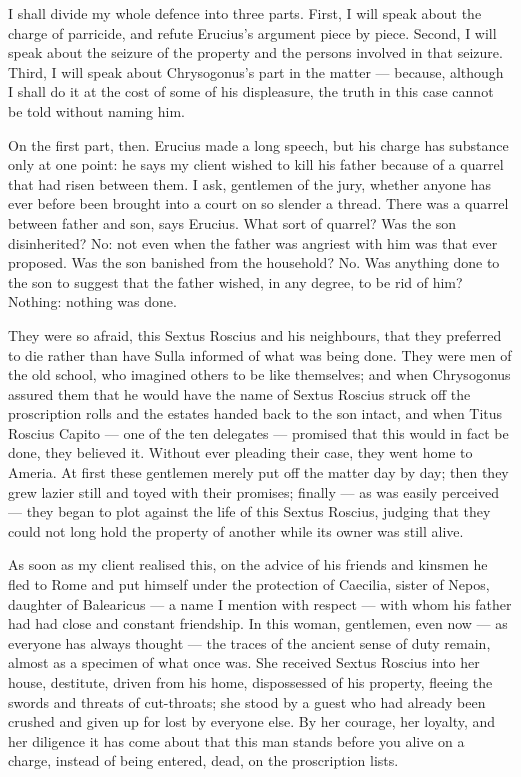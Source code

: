  I shall divide my whole defence into three parts. First, I will speak about the charge of parricide, and refute Erucius's argument piece by piece. Second, I will speak about the seizure of the property and the persons involved in that seizure. Third, I will speak about Chrysogonus's part in the matter --- because, although I shall do it at the cost of some of his displeasure, the truth in this case cannot be told without naming him.

 On the first part, then. Erucius made a long speech, but his charge has substance only at one point: he says my client wished to kill his father because of a quarrel that had risen between them. I ask, gentlemen of the jury, whether anyone has ever before been brought into a court on so slender a thread. There was a quarrel between father and son, says Erucius. What sort of quarrel? Was the son disinherited? No: not even when the father was angriest with him was that ever proposed. Was the son banished from the household? No. Was anything done to the son to suggest that the father wished, in any degree, to be rid of him? Nothing: nothing was done.

 They were so afraid, this Sextus Roscius and his neighbours, that they preferred to die rather than have Sulla informed of what was being done. They were men of the old school, who imagined others to be like themselves; and when Chrysogonus assured them that he would have the name of Sextus Roscius struck off the proscription rolls and the estates handed back to the son intact, and when Titus Roscius Capito --- one of the ten delegates --- promised that this would in fact be done, they believed it. Without ever pleading their case, they went home to Ameria. At first these gentlemen merely put off the matter day by day; then they grew lazier still and toyed with their promises; finally --- as was easily perceived --- they began to plot against the life of this Sextus Roscius, judging that they could not long hold the property of another while its owner was still alive.

 As soon as my client realised this, on the advice of his friends and kinsmen he fled to Rome and put himself under the protection of Caecilia, sister of Nepos, daughter of Balearicus --- a name I mention with respect --- with whom his father had had close and constant friendship. In this woman, gentlemen, even now --- as everyone has always thought --- the traces of the ancient sense of duty remain, almost as a specimen of what once was. She received Sextus Roscius into her house, destitute, driven from his home, dispossessed of his property, fleeing the swords and threats of cut-throats; she stood by a guest who had already been crushed and given up for lost by everyone else. By her courage, her loyalty, and her diligence it has come about that this man stands before you alive on a charge, instead of being entered, dead, on the proscription lists.

